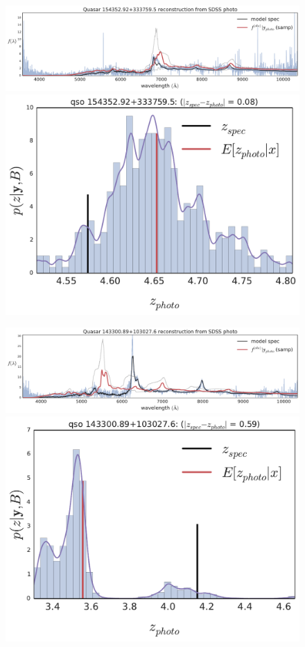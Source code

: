 \documentclass{article}
\begin{document}
\begin{figure}[t]
\vskip 0in
\centerline{
\includegraphics[width=1.5\columnwidth]{../figs/quasar_plots/quasar_490_mcmc_recon.pdf}
\includegraphics[width=.57\columnwidth]{../figs/quasar_plots/quasar_490_posterior_z}
} 
\centerline{
\includegraphics[width=1.5\columnwidth]{../figs/quasar_plots/quasar_214_mcmc_recon.pdf}
\includegraphics[width=.57\columnwidth]{../figs/quasar_plots/quasar_214_posterior_z}
}

\end{figure}
\end{document}
